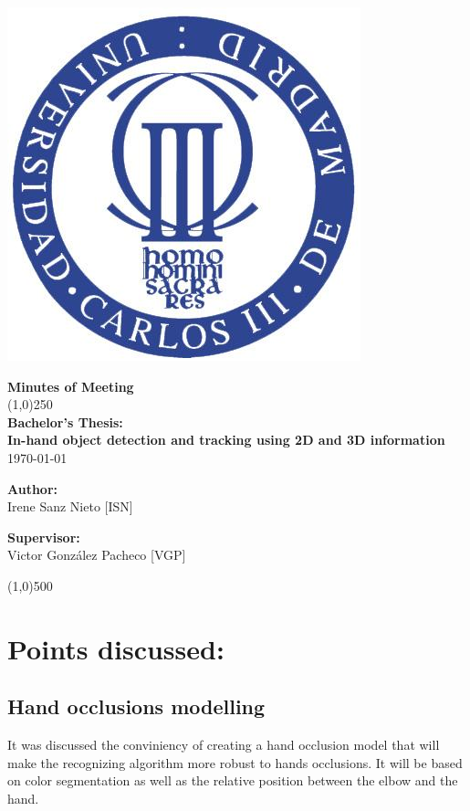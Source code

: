 \documentclass{article}
\newenvironment{myindentpar}[1]%
 {\begin{list}{}%
         {\setlength{\leftmargin}{#1}}%
         \item[]%
 }
 {\end{list}}
\begin{document}
\includegraphics[width=0.1\linewidth]{../template/uc3m.jpg}

\vspace{-1cm}
\begin{minipage}[b]{1\linewidth}
	\begin{center}
	{\Huge \bfseries{Minutes of Meeting}}\\
	\line(1,0){250}\\[0.5cm]
	{\LARGE \textbf{Bachelor's Thesis:\\[0.5cm] In-hand object detection and tracking using 2D and 3D information}}\\[0.5cm]
	{\large \today}
	\end{center}
\end {minipage}



\begin{minipage}{0.55\textwidth}
\begin{flushleft} \large
\textbf{{Author:}\\}
Irene Sanz Nieto [ISN]\\
\end{flushleft}
\end{minipage}
\begin{minipage}{0.4\textwidth}
\begin{flushright} \large
\textbf{Supervisor: }\\
Victor González Pacheco [VGP]
\end{flushright}\end{minipage}

\begin{center}
\line(1,0){500}
\end{center}

\renewcommand{\thesubsection}
{\hspace*{1cm} \arabic{section}.\arabic{subsection}}



\section{\LARGE Points discussed: }
	\subsection{Hand occlusions modelling}
		\begin{myindentpar}{1cm} 
		It was discussed the conviniency of creating a hand occlusion model that will make the recognizing algorithm more robust to hands occlusions. It will  be based on color segmentation as well as the relative position between the elbow and the hand. 
		\end{myindentpar}
\end{document}
